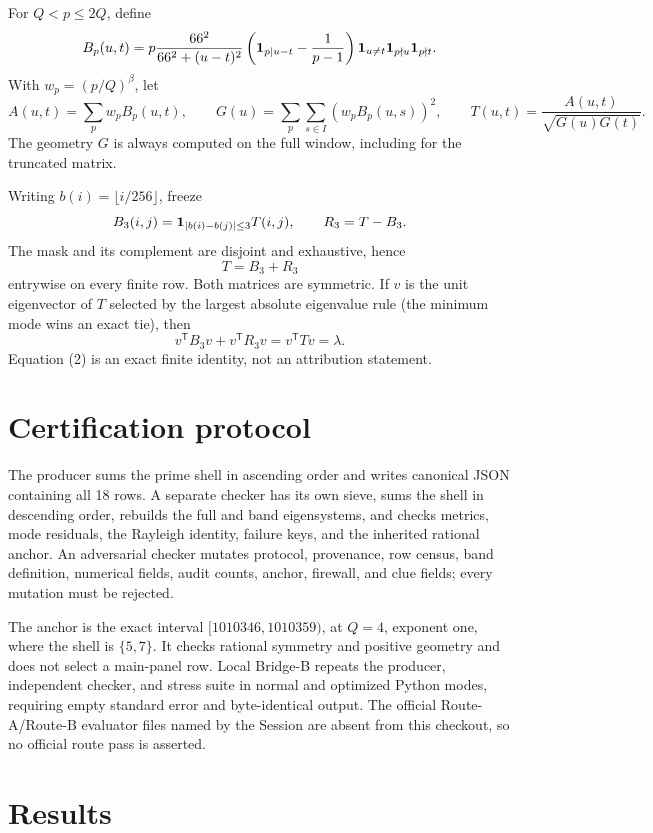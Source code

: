 \documentclass[10pt]{article}
\begin{document}
For \(Q<p\leq 2Q\), define
\[
B_p(u,t)=p\frac{66^2}{66^2+(u-t)^2}
\left({\bf1}_{p\mid u-t}-\frac{1}{p-1}\right)
{\bf1}_{u\ne t}{\bf1}_{p\nmid u}{\bf1}_{p\nmid t}.
\]
With \(w_p=(p/Q)^\beta\), let
\[
A(u,t)=\sum_p w_pB_p(u,t),\qquad
G(u)=\sum_p\sum_{s\in I}(w_pB_p(u,s))^2,
\qquad T(u,t)=\frac{A(u,t)}{\sqrt{G(u)G(t)}}.
\]
The geometry \(G\) is always computed on the full window, including for
the truncated matrix.

Writing \(b(i)=\lfloor i/256\rfloor\), freeze
\[
B_3(i,j)={\bf1}_{|b(i)-b(j)|\leq3}T(i,j),\qquad
R_3=T-B_3.
\]
The mask and its complement are disjoint and exhaustive, hence
\[
                 T=B_3+R_3                                      \tag{1}
\]
entrywise on every finite row.  Both matrices are symmetric.  If \(v\) is
the unit eigenvector of \(T\) selected by the largest absolute eigenvalue
rule (the minimum mode wins an exact tie), then
\[
 v^{\mathsf T}B_3v+v^{\mathsf T}R_3v
 =v^{\mathsf T}Tv=\lambda.                                      \tag{2}
\]
Equation (2) is an exact finite identity, not an attribution statement.

\section{Certification protocol}

The producer sums the prime shell in ascending order and writes canonical
JSON containing all 18 rows.  A separate checker has its own sieve, sums the
shell in descending order, rebuilds the full and band eigensystems, and
checks metrics, mode residuals, the Rayleigh identity, failure keys, and the
inherited rational anchor.  An adversarial checker mutates protocol,
provenance, row census, band definition, numerical fields, audit counts,
anchor, firewall, and clue fields; every mutation must be rejected.

The anchor is the exact interval \([1010346,1010359)\), at \(Q=4\), exponent
one, where the shell is \(\{5,7\}\).  It checks rational symmetry and
positive geometry and does not select a main-panel row.  Local Bridge-B
repeats the producer, independent checker, and stress suite in normal and
optimized Python modes, requiring empty standard error and byte-identical
output.  The official Route-A/Route-B evaluator files named by the Session
are absent from this checkout, so no official route pass is asserted.

\section{Results}
\end{document}
